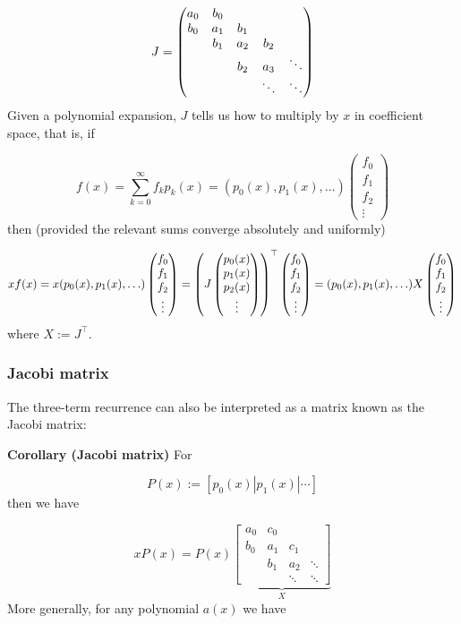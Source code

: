 \documentclass[12pt,a4paper]{article}
\begin{document}
\[
J = \begin{pmatrix}
a_0 & b_0 \cr
b_0 & a_1 & b_1 \cr
& b_1 & a_2 & b_2 \cr
&& b_2 & a_3 & \ddots \cr
&&&\ddots & \ddots
\end{pmatrix}
\]
Given a polynomial expansion, $J$ tells us how to multiply by $x$ in coefficient space, that is, if

\[
f(x) = \sum_{k=0}^\infty f_k p_k(x) =   (p_0(x) ,  p_1(x) , \ldots ) \begin{pmatrix}f_0\\ f_1\\f_2\\\vdots\end{pmatrix}
\]
then (provided the relevant sums converge absolutely and uniformly)

\[
x f(x) = x (p_0(x) ,  p_1(x) , \ldots ) \begin{pmatrix}f_0\\ f_1\\f_2\\\vdots\end{pmatrix} =
    \left(J \begin{pmatrix} p_0(x) \cr p_1(x) \cr p_2(x) \cr \vdots \end{pmatrix}\right)^\top  \begin{pmatrix}f_0\\ f_1\\f_2\\\vdots\end{pmatrix} = (p_0(x) ,  p_1(x) , \ldots ) X \begin{pmatrix}f_0\\ f_1\\f_2\\\vdots\end{pmatrix}
\]
where $X := J^\top$.

\subsubsection{Jacobi matrix}
The three-term recurrence can also be interpreted as a matrix known as the Jacobi matrix:

\textbf{Corollary (Jacobi matrix)} For

\[
P(x) := [p_0(x) | p_1(x) | \ensuremath{\cdots}]
\]
then we have

\[
x P(x) = P(x) \underbrace{\begin{bmatrix} a_0 & c_0 \\
                                                        b_0 & a_1 & c_1\\
                                                        & b_1 & a_2 & \ensuremath{\ddots} \\
                                                        && \ensuremath{\ddots} & \ensuremath{\ddots}
                                                        \end{bmatrix}}_X
\]
More generally, for any polynomial $a(x)$ we have
\end{document}
